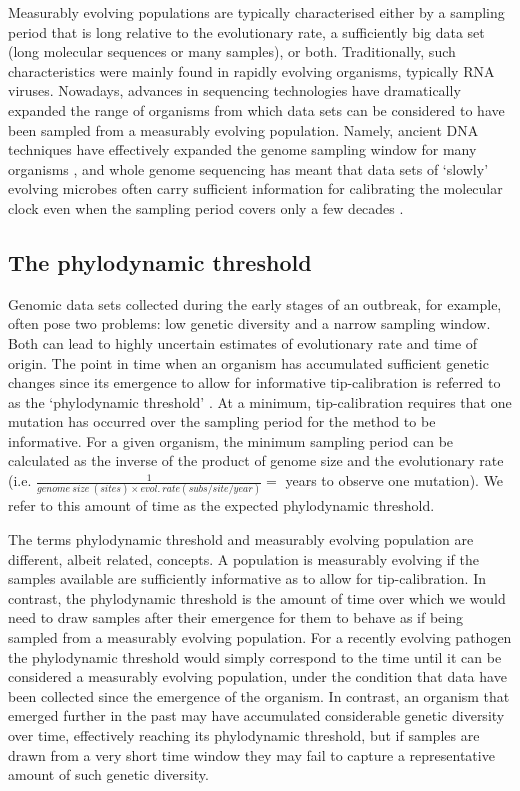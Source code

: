 \documentclass[11pt]{article}
\begin{document}
Measurably evolving populations are typically characterised either by a sampling period that is long relative to the evolutionary rate, a sufficiently big data set (long molecular sequences or many samples), or both. Traditionally, such characteristics were mainly found in rapidly evolving organisms, typically RNA viruses. Nowadays, advances in sequencing technologies have dramatically expanded the range of organisms from which data sets can be considered to have been sampled from a measurably evolving population. Namely, ancient DNA techniques have effectively expanded the genome sampling window for many organisms \citep{spyrou2019ancient, duchene2020recovery}, and whole genome sequencing has meant that data sets of `slowly' evolving microbes often carry sufficient information for calibrating the molecular clock \citep{biek2015measurably} even when the sampling period covers only a few decades \citep{menardo2019molecular}.

\subsection{The phylodynamic threshold}
Genomic data sets collected during the early stages of an outbreak, for example, often pose two problems: low genetic diversity and a narrow sampling window. Both can lead to highly uncertain estimates of evolutionary rate and time of origin. The point in time when an organism has accumulated sufficient genetic changes since its emergence to allow for informative tip-calibration is referred to as the ‘phylodynamic threshold’ \citep{duchene2020temporal}. At a minimum, tip-calibration requires that one mutation has occurred over the sampling period for the method to be informative. For a given organism, the minimum sampling period can be calculated as the inverse of the product of genome size and the evolutionary rate (i.e. $\frac{1}{genome\ size\ (sites) \times evol.\ rate (subs/site/year)}=$ years to observe one mutation). We refer to this amount of time as the expected phylodynamic threshold. 

The terms phylodynamic threshold and measurably evolving population are different, albeit related, concepts. A population is measurably evolving if the samples available are sufficiently informative as to allow for tip-calibration. In contrast, the phylodynamic threshold is the amount of time over which we would need to draw samples after their emergence for them to behave as if being sampled from a measurably evolving population. For a recently evolving pathogen the phylodynamic threshold would simply correspond to the time until it can be considered a measurably evolving population, under the condition that data have been collected since the emergence of the organism. In contrast, an organism that emerged further in the past may have accumulated considerable genetic diversity over time, effectively reaching its phylodynamic threshold, but if samples are drawn from a very short time window they may fail to capture a representative amount of such genetic diversity. 
\end{document}
